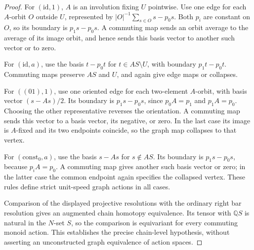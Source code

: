 \begin{proof}
For $(\mathrm{id},1)$, $A$ is an involution fixing
$U$ pointwise.  Use one edge for each $A$-orbit $O$
outside $U$, represented by
$|O|^{-1}\sum_{s\in O}s-p_0s$.  Both $p_i$ are
constant on $O$, so its boundary is $p_1s-p_0s$.
A commuting map sends an orbit average to the average
of its image orbit, and hence sends this basis vector
to another such vector or to zero.

For $(\mathrm{id},a)$, use the basis $t-p_0t$ for
$t\in AS\setminus U$, with boundary $p_1t-p_0t$.
Commuting maps preserve $AS$ and $U$, and again give
edge maps or collapses.

For $((01),1)$, use one oriented edge for each
two-element $A$-orbit, with basis vector $(s-As)/2$.
Its boundary is $p_1s-p_0s$, since $p_0A=p_1$ and
$p_1A=p_0$.  Choosing the other representative reverses
the orientation.  A commuting map sends this vector
to a basis vector, its negative, or zero.  In the
last case its image is $A$-fixed and its two endpoints
coincide, so the graph map collapses to that vertex.

For $(\mathrm{const}_0,a)$, use the basis $s-As$ for
$s\notin AS$.  Its boundary is $p_1s-p_0s$, because
$p_iA=p_0$.  A commuting map gives another such basis
vector or zero; in the latter case the common endpoint
again specifies the collapsed vertex.  These rules
define strict unit-speed graph actions in all cases.

Comparison of the displayed projective resolutions
with the ordinary right bar resolution gives an
augmented chain homotopy equivalence.  Its tensor with
$\mathbb QS$ is natural in the $N$-set $S$, so the
comparison is equivariant for every commuting monoid
action.  This establishes the precise chain-level
hypothesis, without asserting an unconstructed graph
equivalence of action spaces.
\end{proof}

